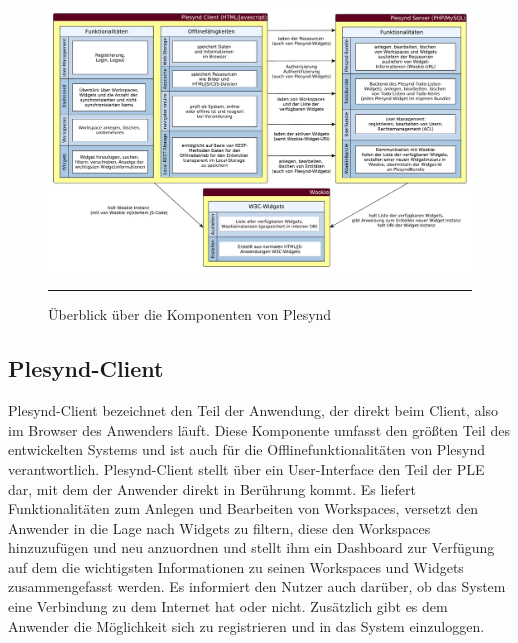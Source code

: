 \begin{landscape}
\begin{figure}
  \centering
  \includegraphics[height=\textheight,keepaspectratio]{./Figures/konzeptionelle_loesung_table.pdf}
    \rule{35em}{0.5pt}
  \caption[Überblick über die Komponenten von Plesynd]{Überblick über die Komponenten von Plesynd}
  \label{fig:ueberblick_plesynd_komponenten}
\end{figure}
\end{landscape}

\subsection{Plesynd-Client}
Plesynd-Client bezeichnet den Teil der Anwendung, der direkt beim Client, also im Browser des Anwenders läuft. Diese Komponente umfasst den größten Teil des entwickelten Systems und ist auch für die Offlinefunktionalitäten von Plesynd verantwortlich. Plesynd-Client stellt über ein User-Interface den Teil der PLE dar, mit dem der Anwender direkt in Berührung kommt. Es liefert Funktionalitäten zum Anlegen und Bearbeiten von Workspaces, versetzt den Anwender in die Lage nach Widgets zu filtern, diese den Workspaces hinzuzufügen und neu anzuordnen und stellt ihm ein Dashboard zur Verfügung auf dem die wichtigsten Informationen zu seinen Workspaces und Widgets zusammengefasst werden. Es informiert den Nutzer auch darüber, ob das System eine Verbindung zu dem Internet hat oder nicht. Zusätzlich gibt es dem Anwender die Möglichkeit sich zu registrieren und in das System einzuloggen. 

